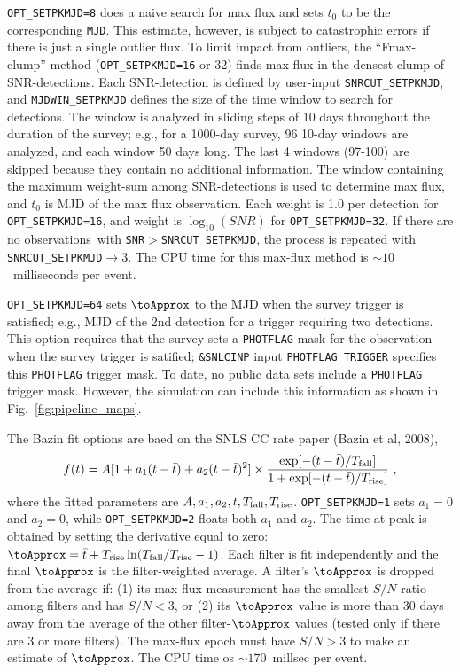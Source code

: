 \documentclass[12pt]{article}
\newcommand{\Tfall}{T_{\rm fall}}
\newcommand{\Trise}{T_{\rm rise}}
\newcommand{\obss}{observations}
\begin{document}
{\tt OPT\_SETPKMJD=8} does a naive search for max flux and sets 
$t_0$ to be the corresponding {\tt MJD}. This estimate, however,
is subject to catastrophic errors if there is just a single outlier
flux. To limit impact from outliers, the ``Fmax-clump'' method
({\tt OPT\_SETPKMJD=16} or {32}) finds max flux in the densest clump of 
SNR-detections.
Each SNR-detection is defined by user-input {\tt SNRCUT\_SETPKMJD},
and {\tt MJDWIN\_SETPKMJD} defines the size of the time window to 
search for detections. The window is analyzed in sliding steps of
10 days throughout the duration of the survey; 
e.g., for a 1000-day survey, 96 10-day windows are analyzed,
and each window 50 days long. The last 4 windows (97-100) 
are skipped because they contain no additional information.
The window containing the maximum weight-sum among SNR-detections is used 
to determine max flux, and $t_0$ is MJD of the max flux observation.
Each weight is 1.0 per detection for {\tt OPT\_SETPKMJD=16},
and weight is $\log_{10}(SNR)$ for {\tt OPT\_SETPKMJD=32}.
If there are no \obss\ with {\tt SNR}$>${\tt SNRCUT\_SETPKMJD},
the process is repeated with {\tt SNRCUT\_SETPKMJD}$\to 3$.
The CPU time for this max-flux method is ${\sim}10$~milliseconds per event.


{\tt OPT\_SETPKMJD=64} sets $\toApprox$ to the MJD when the survey
trigger is satisfied; e.g., MJD of the 2nd detection for a 
trigger requiring two detections. This option requires that the
survey sets a {\tt PHOTFLAG} mask for the observation when the
survey trigger is satified; {\tt\&SNLCINP} input {\tt PHOTFLAG\_TRIGGER}
specifies this {\tt PHOTFLAG} trigger mask. 
To date, no public data sets include a {\tt PHOTFLAG} trigger mask. 
However, the simulation can include this information
as shown in Fig.~\ref{fig:pipeline_maps}.


The Bazin fit options are baed on the SNLS CC rate paper (Bazin et al, 2008),
%
\begin{equation}
  f(t) =   A [1 + a_1(t-\bar{t}) + a_2(t-\bar{t})^2 ] \times
            \frac{\exp[-(t- \bar{t})/{\Tfall}]}
              {1 + \exp[-(t- \bar{t})/{\Trise}]}~,
   \label{eq:t0fun}
\end{equation}
%
where the fitted parameters are $A, a_1, a_2, \bar{t}, \Tfall, \Trise$.
{\tt OPT\_SETPKMJD=1} sets $a_1=0$ and $a_2=0$, while
{\tt OPT\_SETPKMJD=2} floats both $a_1$ and $a_2$.
The time at peak is obtained by setting the derivative equal
to zero: $\toApprox = \bar{t} + \Trise \ln(\Tfall/\Trise-1)$.
Each filter is fit independently and
the final $\toApprox$ is the filter-weighted average.
A filter's $\toApprox$ is dropped from the average if:
(1) its max-flux measurement has the smallest $S/N$ 
ratio among filters and has $S/N<3$, or
(2) its $\toApprox$ value is more than 30 days away from the average
of the other filter-$\toApprox$ values 
(tested only if there are 3 or more filters).
The max-flux epoch must have $S/N > 3$ to make an estimate of $\toApprox$.
The CPU time os ${\sim}170$~millsec per event.
\end{document}
